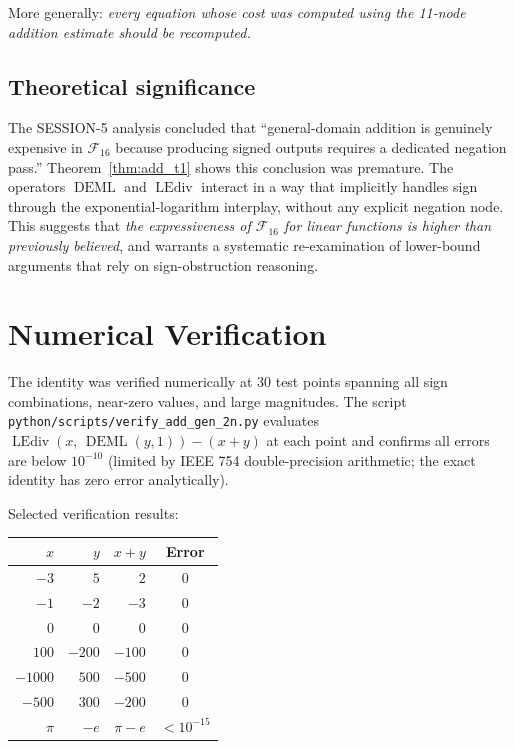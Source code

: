 \documentclass[12pt,a4paper]{article}
\theoremstyle{definition}
\newcommand{\DEML}{\operatorname{DEML}}
\newcommand{\LEdiv}{\operatorname{LEdiv}}
\newcommand{\F}{\mathcal{F}_{16}}
\begin{document}
More generally: \emph{every equation whose cost was computed using the 11-node
addition estimate should be recomputed.}

\subsection*{Theoretical significance}
The SESSION-5 analysis concluded that ``general-domain addition is genuinely
expensive in $\F$ because producing signed outputs requires a dedicated negation
pass.''
Theorem~\ref{thm:add_t1} shows this conclusion was premature.
The operators $\DEML$ and $\LEdiv$ interact in a way that implicitly handles
sign through the exponential-logarithm interplay, without any explicit negation
node.
This suggests that \emph{the expressiveness of $\F$ for linear functions is
higher than previously believed}, and warrants a systematic re-examination of
lower-bound arguments that rely on sign-obstruction reasoning.

\section{Numerical Verification}
\label{sec:numerical}

The identity was verified numerically at 30 test points spanning all sign
combinations, near-zero values, and large magnitudes.
The script \texttt{python/scripts/verify\_add\_gen\_2n.py} evaluates
$\LEdiv(x,\,\DEML(y,1)) - (x+y)$ at each point and confirms all errors are
below $10^{-10}$ (limited by IEEE 754 double-precision arithmetic; the exact
identity has zero error analytically).

Selected verification results:

\begin{center}
\begin{tabular}{rrrc}
\toprule
$x$ & $y$ & $x+y$ & Error \\
\midrule
$-3$     & $ 5$    & $2$    & $0$ \\
$-1$     & $-2$    & $-3$   & $0$ \\
$ 0$     & $ 0$    & $0$    & $0$ \\
$ 100$   & $-200$  & $-100$ & $0$ \\
$-1000$  & $ 500$  & $-500$ & $0$ \\
$-500$   & $ 300$  & $-200$ & $0$ \\
$\pi$    & $-e$    & $\pi-e$& $< 10^{-15}$ \\
\bottomrule
\end{tabular}
\end{center}
\end{document}
